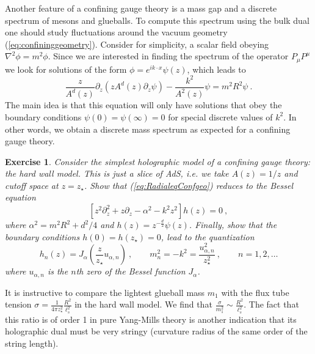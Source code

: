 \documentclass{ws-rv9x6}
\newtheorem{exercise}{Exercise}[section]
\newcommand\be{\begin{equation}}
\newcommand\ee{\end{equation}}
\begin{document}
Another feature of a confining gauge theory is a mass gap and a discrete
spectrum of mesons and glueballs. To compute this spectrum using the
bulk dual one should study fluctuations around the vacuum geometry
(\ref{eq:confininggeometry}). Consider for simplicity, a scalar field
obeying $\nabla^{2}\phi=m^{2}\phi$. Since we are interested in finding
the spectrum of the operator $P_{\mu}P^{\mu}$ we look for solutions
of the form $\phi=e^{ik\cdot x}\psi(z)$, which leads to 
\begin{equation}
\frac{z}{A^{d}(z)}\partial_{z}\left(zA^{d}(z)\partial_{z}\psi\right)-\frac{k^{2}}{A^{2}(z)}\psi=m^{2}R^{2}\psi\ .\label{eq:RadialeqConfgeo}
\end{equation}
The main idea is that this equation will only have solutions that
obey the boundary conditions $\psi(0)=\psi(\infty)=0$ for special
discrete values of $k^{2}$. In other words, we obtain a discrete
mass spectrum as expected for a confining gauge theory.
\begin{exercise} 
Consider the simplest holographic model of a confining
gauge theory: the hard wall model. This is just a slice of AdS, i.e.
we take $A(z)=1/z$ and cutoff space at $z=z_{\star}$. Show that
(\ref{eq:RadialeqConfgeo}) reduces to the Bessel equation
\be
\left[z^{2}\partial_{z}^{2}+z\partial_{z}-\alpha^{2}-k^{2}z^{2}\right]h(z)=0\ ,
\ee
where $\alpha^{2}=m^{2}R^{2}+d^{2}/4$ and $h(z)=z^{-\frac{d}{2}}\psi(z)$.
Finally, show that the boundary conditions $h(0)=h(z_{\star})=0$,
lead to the quantization
\be
h_{n}(z)=J_{\alpha}\left(\frac{z}{z_{\star}}u_{\alpha,n}\right)\ ,\qquad m_{n}^{2}=-k^{2}=\frac{u_{\alpha,n}^{2}}{z_{\star}^{2}}\ ,\qquad n=1,2,\dots
\ee
where $u_{\alpha,n}$ is the $n$th zero of the Bessel function $J_{\alpha}$. 
\end{exercise}

It is instructive to compare the lightest glueball mass $m_{1}$ with
the flux tube tension $\sigma=\frac{1}{4\pi z_{\star}^{2}}\frac{R^{2}}{\ell_{s}^{2}}$
in the hard wall model. We find that $\frac{\sigma}{m_{1}^{2}}\sim\frac{R^{2}}{\ell_{s}^{2}}$.
The fact that this ratio is of order 1 in pure Yang-Mills theory is
another indication that its holographic dual must be very stringy
(curvature radius of the same order of the string length). 
\end{document}

